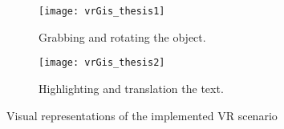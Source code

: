 \begin{figure}
  \centering
  \begin{subfigure}[b]{0.45\textwidth}
      \centering
      \texttt{[image: vrGis\_thesis1]}
      \caption{Grabbing and rotating the object.}
      \label{fig:vrGis_thesis1}
  \end{subfigure}
  \hfill
  \begin{subfigure}[b]{0.45\textwidth}
      \centering
      \texttt{[image: vrGis\_thesis2]}
      \caption{Highlighting and translation the text.}
      \label{fig:vrGis_thesis2}
  \end{subfigure}
     \caption{Visual representations of the implemented \gls{VR} scenario}
     \label{fig:vrGis_thesis}
\end{figure}









